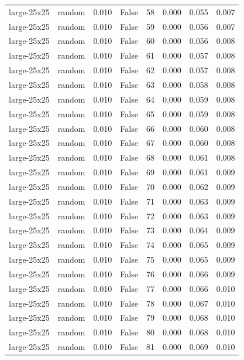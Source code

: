 \begin{tabular}{llrrrrrr}
large-25x25 & random & 0.010 & False & 58 & 0.000 & 0.055 & 0.007 \\
large-25x25 & random & 0.010 & False & 59 & 0.000 & 0.056 & 0.007 \\
large-25x25 & random & 0.010 & False & 60 & 0.000 & 0.056 & 0.008 \\
large-25x25 & random & 0.010 & False & 61 & 0.000 & 0.057 & 0.008 \\
large-25x25 & random & 0.010 & False & 62 & 0.000 & 0.057 & 0.008 \\
large-25x25 & random & 0.010 & False & 63 & 0.000 & 0.058 & 0.008 \\
large-25x25 & random & 0.010 & False & 64 & 0.000 & 0.059 & 0.008 \\
large-25x25 & random & 0.010 & False & 65 & 0.000 & 0.059 & 0.008 \\
large-25x25 & random & 0.010 & False & 66 & 0.000 & 0.060 & 0.008 \\
large-25x25 & random & 0.010 & False & 67 & 0.000 & 0.060 & 0.008 \\
large-25x25 & random & 0.010 & False & 68 & 0.000 & 0.061 & 0.008 \\
large-25x25 & random & 0.010 & False & 69 & 0.000 & 0.061 & 0.009 \\
large-25x25 & random & 0.010 & False & 70 & 0.000 & 0.062 & 0.009 \\
large-25x25 & random & 0.010 & False & 71 & 0.000 & 0.063 & 0.009 \\
large-25x25 & random & 0.010 & False & 72 & 0.000 & 0.063 & 0.009 \\
large-25x25 & random & 0.010 & False & 73 & 0.000 & 0.064 & 0.009 \\
large-25x25 & random & 0.010 & False & 74 & 0.000 & 0.065 & 0.009 \\
large-25x25 & random & 0.010 & False & 75 & 0.000 & 0.065 & 0.009 \\
large-25x25 & random & 0.010 & False & 76 & 0.000 & 0.066 & 0.009 \\
large-25x25 & random & 0.010 & False & 77 & 0.000 & 0.066 & 0.010 \\
large-25x25 & random & 0.010 & False & 78 & 0.000 & 0.067 & 0.010 \\
large-25x25 & random & 0.010 & False & 79 & 0.000 & 0.068 & 0.010 \\
large-25x25 & random & 0.010 & False & 80 & 0.000 & 0.068 & 0.010 \\
large-25x25 & random & 0.010 & False & 81 & 0.000 & 0.069 & 0.010 \\

\end{tabular}
